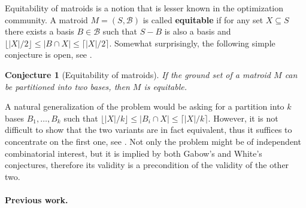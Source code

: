 \documentclass[11pt,a4paper]{article}
\theoremstyle{plain}
\newtheorem{conj}[thm]{Conjecture}
\theoremstyle{definition}
\newcommand{\cB}{\mathcal{B}}
\begin{document}

Equitability of matroids is a notion that is lesser known in the optimization community. A matroid $M=(S,\cB)$ is called \textbf{equitable} if for any set $X\subseteq S$ there exists a basis $B\in\cB$ such that $S-B$ is also a basis and $\lfloor|X|/2\rfloor\leq|B\cap X|\leq\lceil|X|/2\rceil$. Somewhat surprisingly, the following simple conjecture is open, see \cite{egres_open_equit}.

\begin{conj}[Equitability of matroids] \label{conj:equitable}
If the ground set of a matroid $M$ can be partitioned into two bases, then $M$ is equitable.
\end{conj}

A natural generalization of the problem would be asking for a partition into $k$ bases $B_1,\dots,B_k$ such that $\lfloor|X|/k\rfloor\leq|B_i\cap X|\leq\lceil|X|/k\rceil$. However, it is not difficult to show that the two variants are in fact equivalent, thus it suffices to concentrate on the first one, see \cite{egres_open_equit}. Not only the problem might be of independent combinatorial interest, but it is implied by both Gabow's and White's conjectures, therefore its validity is a precondition of the validity of the other two.

\paragraph{Previous work.}
\end{document}
